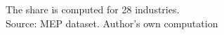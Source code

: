 \begin{table}[hbt]
{\begin{threeparttable}
\begin{tabular}{l*{2}{c}}
\hline
\end{tabular}
\begin{tablenotes}
      \small
      \item The share is computed for 28 industries. \\
      Source: MEP dataset. Author's own computation 
    \end{tablenotes}
    \label{tab:so2share}
\end{threeparttable}}
\end{table}